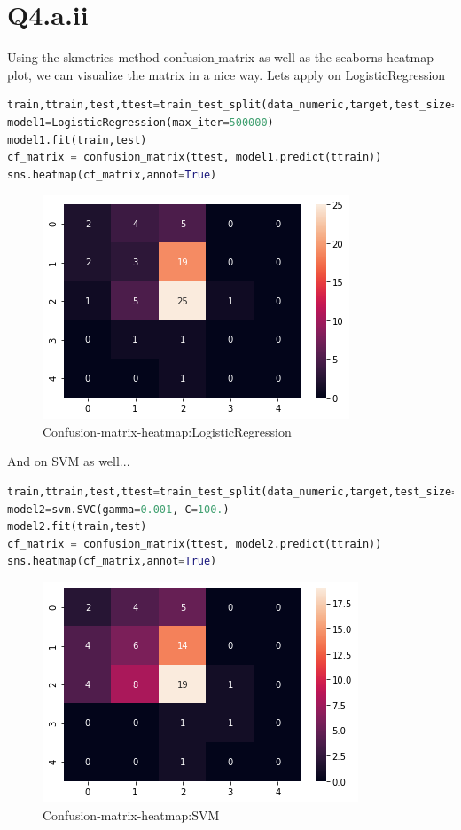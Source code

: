 \documentclass[openany]{article}
\begin{document}
		\section{Q4.a.ii}
			Using the skmetrics method confusion$\_$matrix as well as the seaborns heatmap plot, we can visualize the matrix in a nice way. Lets apply on LogisticRegression
			\begin{lstlisting}[language=Python]
train,ttrain,test,ttest=train_test_split(data_numeric,target,test_size=0.2,random_state=42)
model1=LogisticRegression(max_iter=500000)
model1.fit(train,test)
cf_matrix = confusion_matrix(ttest, model1.predict(ttrain))
sns.heatmap(cf_matrix,annot=True)
			\end{lstlisting}
			\begin{figure}[H]
				\iftrue
				\centering
				\caption{Confusion-matrix-heatmap:LogisticRegression}
				\includegraphics[scale=0.5]{q4-a-ii-1}
				\fi
			\end{figure}
			And on SVM as well...
			\begin{lstlisting}[language=Python]
train,ttrain,test,ttest=train_test_split(data_numeric,target,test_size=0.2,random_state=42)
model2=svm.SVC(gamma=0.001, C=100.)
model2.fit(train,test)
cf_matrix = confusion_matrix(ttest, model2.predict(ttrain))
sns.heatmap(cf_matrix,annot=True)
			\end{lstlisting}
			\begin{figure}[H]
				\iftrue
				\centering
				\caption{Confusion-matrix-heatmap:SVM}
				\includegraphics[scale=0.5]{q4-a-ii-2}
				\fi
			\end{figure}

			
\end{document}
